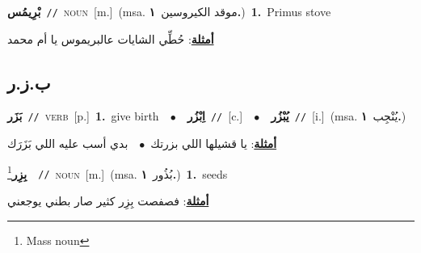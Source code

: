 \documentclass[10pt,a4paper,twoside]{article} %
\begin{document}
\begin{multicols}{2}
{\setlength\topsep{0pt}\textbf{\foreignlanguage{arabic}{بْرِيمُس}}\ {\color{gray}\texttt{//}\color{black}}\ \textsc{noun}\ [m.]\ \color{gray}(msa. \foreignlanguage{arabic}{موقد الكيروسين}~\foreignlanguage{arabic}{\textbf{١.}})\color{black}\ \textbf{1.}~Primus stove\  \begin{flushright}\color{gray}\foreignlanguage{arabic}{\textbf{\underline{\foreignlanguage{arabic}{أمثلة}}}: حُطِّي الشايات عالبريموس يا أم محمد}\end{flushright}\color{black}} \vspace{2mm}

\vspace{-3mm}
\subsection*{\color{blue}\foreignlanguage{arabic}{ب.ز.ر}\color{blue}{}} 

{\setlength\topsep{0pt}\textbf{\foreignlanguage{arabic}{بَزَر}}\ {\color{gray}\texttt{//}\color{black}}\ \textsc{verb}\ [p.]\ \textbf{1.}~give birth\ \ $\bullet$\ \ \setlength\topsep{0pt}\textbf{\foreignlanguage{arabic}{اِبْزُر}}\ {\color{gray}\texttt{//}\color{black}}\ [c.]\ \ $\bullet$\ \ \setlength\topsep{0pt}\textbf{\foreignlanguage{arabic}{يُبْزُر}}\ {\color{gray}\texttt{//}\color{black}}\ [i.]\ \color{gray}(msa. \foreignlanguage{arabic}{يُنْجِب}~\foreignlanguage{arabic}{\textbf{١.}})\color{black}\  \begin{flushright}\color{gray}\foreignlanguage{arabic}{\textbf{\underline{\foreignlanguage{arabic}{أمثلة}}}: يا قشيلها اللي بزرتك\ $\bullet$\ \  بدي أسب عليه اللي بَزَرَك}\end{flushright}\color{black}} \vspace{2mm}

{\setlength\topsep{0pt}\textbf{\foreignlanguage{arabic}{بِزِر}}\footnote{Mass noun}\ \ {\color{gray}\texttt{//}\color{black}}\ \textsc{noun}\ [m.]\ \color{gray}(msa. \foreignlanguage{arabic}{بُذُور}~\foreignlanguage{arabic}{\textbf{١.}})\color{black}\ \textbf{1.}~seeds\  \begin{flushright}\color{gray}\foreignlanguage{arabic}{\textbf{\underline{\foreignlanguage{arabic}{أمثلة}}}: فصفصت بِزِر كثير صار بطني يوجعني}\end{flushright}\color{black}} \vspace{2mm}


\end{multicols}
\end{document}
